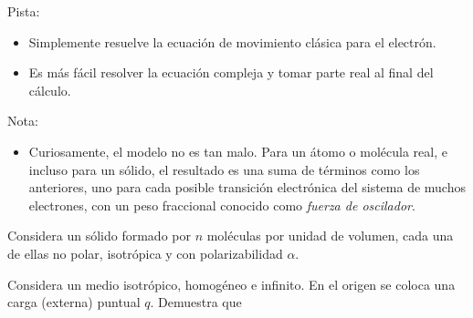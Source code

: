 \documentclass{exam}
\begin{document}
\begin{questions}

  Pista:
  \begin{itemize}
  \item Simplemente resuelve la ecuación de movimiento clásica para el
    electrón.
  \item Es más fácil resolver la ecuación compleja y tomar parte real
    al final del cálculo.
  \end{itemize}
  Nota:
    \begin{itemize}
    \item Curiosamente, el modelo no es tan malo. Para un átomo o
      molécula real, e incluso para un sólido, el resultado es una suma de términos como los
      anteriores, uno para cada posible transición electrónica del
      sistema de muchos electrones, con un peso fraccional conocido
      como {\em fuerza de oscilador}.
    \end{itemize}

  \question Considera un sólido formado por $n$ moléculas por unidad
  de volumen, cada una de ellas no polar, isotrópica y con polarizabilidad $\alpha$.

  \question Considera un medio isotrópico, homogéneo e infinito. En el
  origen se coloca una carga (externa) puntual $q$. Demuestra que
  \begin{parts}

\end{parts}
\end{questions}
\end{document}
